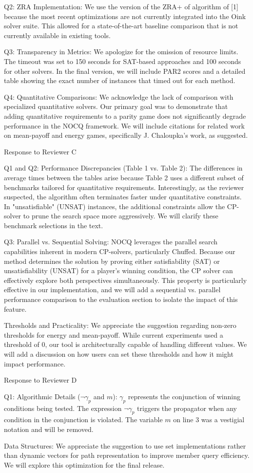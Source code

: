 \documentclass{article}
\begin{document}
Q2: ZRA Implementation: We use the version of the ZRA+ of algorithm of [1] because the most recent optimizations are not currently integrated into the Oink solver suite. This allowed for a state-of-the-art baseline comparison that is not currently available in existing tools.

Q3: Transparency in Metrics: We apologize for the omission of resource limits. The timeout was set to 150 seconds for SAT-based approaches and 100 seconds for other solvers. In the final version, we will include PAR2 scores and a detailed table showing the exact number of instances that timed out for each method.

Q4: Quantitative Comparisons: We acknowledge the lack of comparison with specialized quantitative solvers. Our primary goal was to demonstrate that adding quantitative requirements to a parity game does not significantly degrade performance in the NOCQ framework. We will include citations for related work on mean-payoff and energy games, specifically J. Chaloupka's work, as suggested.

Response to Reviewer C

Q1 and Q2: Performance Discrepancies (Table 1 vs. Table 2): The differences in average times between the tables arise because Table 2 uses a different subset of benchmarks tailored for quantitative requirements. Interestingly, as the reviewer suspected, the algorithm often terminates faster under quantitative constraints. In "unsatisfiable" (UNSAT) instances, the additional constraints allow the CP-solver to prune the search space more aggressively. We will clarify these benchmark selections in the text.

Q3: Parallel vs. Sequential Solving: NOCQ leverages the parallel search capabilities inherent in modern CP-solvers, particularly Chuffed. Because our method determines the solution by proving either satisfiability (SAT) or unsatisfiability (UNSAT) for a player's winning condition, the CP solver can effectively explore both perspectives simultaneously. This property is particularly effective in our implementation, and we will add a sequential vs. parallel performance comparison to the evaluation section to isolate the impact of this feature.

Thresholds and Practicality: We appreciate the suggestion regarding non-zero thresholds for energy and mean-payoff. While current experiments used a threshold of 0, our tool is architecturally capable of handling different values. We will add a discussion on how users can set these thresholds and how it might impact performance.

Response to Reviewer D

Q1: Algorithmic Details ($\neg \gamma_p$ and $m$): $\gamma_p$ represents the conjunction of winning conditions being tested. The expression $\neg \gamma_p$ triggers the propagator when any condition in the conjunction is violated. The variable $m$ on line 3 was a vestigial notation and will be removed. 

Data Structures: We appreciate the suggestion to use set implementations rather than dynamic vectors for path representation to improve member query efficiency. We will explore this optimization for the final release.
\end{document}
